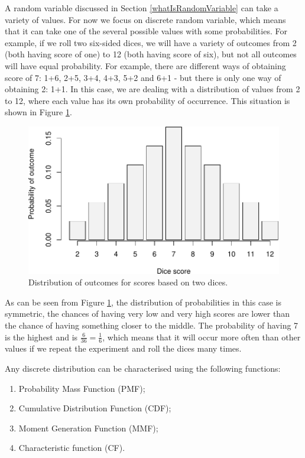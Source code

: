 \documentclass[
]{book}
\providecommand{\tightlist}{%
  \setlength{\itemsep}{0pt}\setlength{\parskip}{0pt}}
\theoremstyle{definition}
\theoremstyle{definition}
\theoremstyle{definition}
\theoremstyle{definition}
\theoremstyle{remark}
\begin{document}
A random variable discussed in Section \ref{whatIsRandomVariable} can take a variety of values. For now we focus on discrete random variable, which means that it can take one of the several possible values with some probabilities. For example, if we roll two six-sided dices, we will have a variety of outcomes from 2 (both having score of one) to 12 (both having score of six), but not all outcomes will have equal probability. For example, there are different ways of obtaining score of 7: 1+6, 2+5, 3+4, 4+3, 5+2 and 6+1 - but there is only one way of obtaining 2: 1+1. In this case, we are dealing with a distribution of values from 2 to 12, where each value has its own probability of occurrence. This situation is shown in Figure \ref{fig:distributionDice12}.

\begin{figure}
\centering
\includegraphics{Svetunkov---Statistics-for-Business-Analytics_files/figure-latex/distributionDice12-1.pdf}
\caption{\label{fig:distributionDice12}Distribution of outcomes for scores based on two dices.}
\end{figure}

As can be seen from Figure \ref{fig:distributionDice12}, the distribution of probabilities in this case is symmetric, the chances of having very low and very high scores are lower than the chance of having something closer to the middle. The probability of having 7 is the highest and is \(\frac{6}{36}=\frac{1}{6}\), which means that it will occur more often than other values if we repeat the experiment and roll the dices many times.

Any discrete distribution can be characterised using the following functions:

\begin{enumerate}
\def\labelenumi{\arabic{enumi}.}
\tightlist
\item
  Probability Mass Function (PMF);
\item
  Cumulative Distribution Function (CDF);
\item
  Moment Generation Function (MMF);
\item
  Characteristic function (CF).
\end{enumerate}
\end{document}
